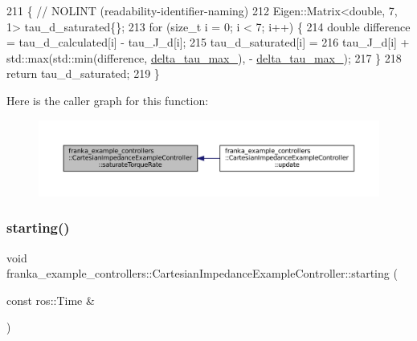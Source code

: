 \begin{DoxyCode}
211                                               \{  \textcolor{comment}{// NOLINT (readability-identifier-naming)}
212   Eigen::Matrix<double, 7, 1> tau\_d\_saturated\{\};
213   \textcolor{keywordflow}{for} (\textcolor{keywordtype}{size\_t} i = 0; i < 7; i++) \{
214     \textcolor{keywordtype}{double} difference = tau\_d\_calculated[i] - tau\_J\_d[i];
215     tau\_d\_saturated[i] =
216         tau\_J\_d[i] + std::max(std::min(difference, \hyperlink{classfranka__example__controllers_1_1CartesianImpedanceExampleController_a3ff07c9bb2c49cc9ac622bb2bd2c8f96}{delta\_tau\_max\_}), -
      \hyperlink{classfranka__example__controllers_1_1CartesianImpedanceExampleController_a3ff07c9bb2c49cc9ac622bb2bd2c8f96}{delta\_tau\_max\_});
217   \}
218   \textcolor{keywordflow}{return} tau\_d\_saturated;
219 \}
\end{DoxyCode}
Here is the caller graph for this function\+:
\nopagebreak
\begin{figure}[H]
\begin{center}
\leavevmode
\includegraphics[width=350pt]{classfranka__example__controllers_1_1CartesianImpedanceExampleController_a1a3dd73a99d2686af41ff8c5ff8f216c_icgraph}
\end{center}
\end{figure}
\mbox{\label{classfranka__example__controllers_1_1CartesianImpedanceExampleController_a9191e1f9d60551294d1f225af39f7926}} 
\subsubsection{\texorpdfstring{starting()}{starting()}}
{\footnotesize\ttfamily void franka\+\_\+example\+\_\+controllers\+::\+Cartesian\+Impedance\+Example\+Controller\+::starting (\begin{DoxyParamCaption}\item[{const ros\+::\+Time \&}]{ }\end{DoxyParamCaption})\hspace{0.3cm}{\ttfamily [override]}}



